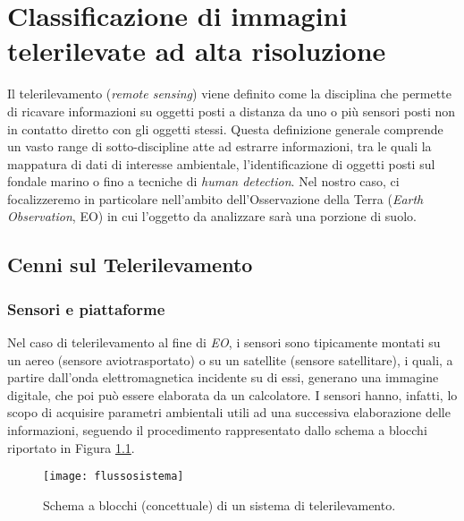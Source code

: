 
\chapter{Classificazione di immagini telerilevate ad alta risoluzione} 
\label{cap:telerilevamento} 

Il telerilevamento (\emph{remote sensing}) viene definito come la disciplina che permette di ricavare informazioni su oggetti posti a distanza da uno o più sensori posti non in contatto diretto con gli oggetti stessi.
Questa definizione generale comprende un vasto range di sotto-discipline atte ad estrarre informazioni, tra le quali la mappatura di dati di interesse ambientale, l'identificazione di oggetti posti sul fondale marino o fino a tecniche di \emph{human detection}.
Nel nostro caso, ci focalizzeremo in particolare nell'ambito dell'Osservazione della Terra (\emph{Earth Observation}, EO) in cui l'oggetto da analizzare sarà una porzione di suolo.
\clearpage


\section{Cenni sul Telerilevamento}


\subsection{Sensori e piattaforme}
Nel caso di telerilevamento al fine di \emph{EO}, i sensori sono tipicamente montati su un aereo (sensore aviotrasportato) o su un satellite (sensore satellitare), i quali, a partire dall'onda elettromagnetica incidente su di essi, generano una immagine digitale, che poi può essere elaborata da un calcolatore. 
I sensori hanno, infatti, lo scopo di acquisire parametri ambientali utili ad una successiva elaborazione delle informazioni, seguendo il procedimento rappresentato dallo schema a blocchi riportato in Figura \ref{fig:flussosistema}.

\begin{figure}[!ht]
\texttt{[image: flussosistema]}
\caption{Schema a blocchi (concettuale) di un sistema di telerilevamento.}
\label{fig:flussosistema}
\end{figure}

